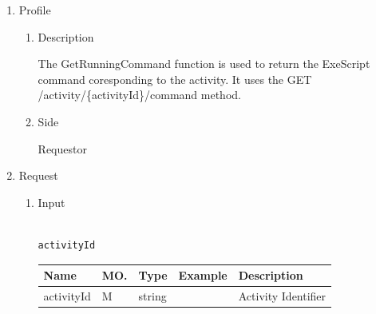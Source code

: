\begin{enumerate}

\item Profile

\begin{enumerate}

\item Description

The GetRunningCommand function is used to return the ExeScript command coresponding to the activity.  
It uses the GET /activity/\{activityId\}/command method. 

\item Side

Requestor

\end{enumerate}

\item Request

\begin{enumerate}

\item Input

\begin{tcolorbox}[boxrule=0pt, frame empty]
\begin{verbatim}

activityId

\end{verbatim}
\end{tcolorbox}





\begin{table}[H]
\footnotesize

\begin{center}
\begin{tabular}{|p{3cm}|l|p{3cm}|p{3cm}|p{4cm}|} 
\hline
\rowcolor{lightgray}	Name	& MO.	& Type	& Example & 	Description \\
\hline

activityId				& M	& 	string				&								&	Activity Identifier \\ 
\hline



\end{tabular}
\end{center}
\end{table}
\end{enumerate}
\end{enumerate}
